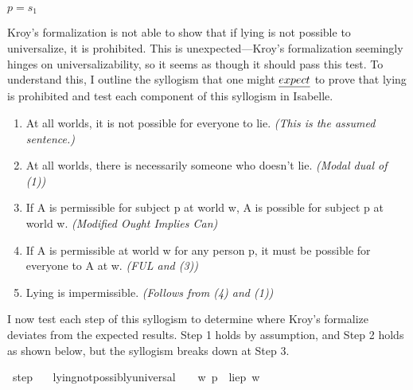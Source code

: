 \begin{isabellebody}
{    $p = s_1$ \color{black}%
}%
\endisatagproof
{\isafoldproof}%
%
\isadelimproof
%
\endisadelimproof
%
\begin{isamarkuptext}%
Kroy's formalization is not able to show that if lying is not possible 
      to universalize, it is prohibited. This is unexpected—Kroy's formalization seemingly hinges
on universalizability, so it seems as though it should pass this test. To understand this, I 
  outline the syllogism that one might $\emph{expect}$ to prove that lying is prohibited and 
test each component of this syllogism in Isabelle.%
\end{isamarkuptext}\isamarkuptrue%
%
\begin{isamarkuptext}%
\begin{enumerate}
        \item At all worlds, it is not possible for everyone to lie. \emph{(This is the assumed sentence.)}
        \item At all worlds, there is necessarily someone who doesn't lie. \emph{(Modal dual of (1))}
        \item If A is permissible for subject p at world w, A is possible for subject p at world w. \emph{(Modified Ought Implies Can)}
        \item If A is permissible at world w for any person p, it must be possible for everyone to A at w. \emph{(FUL and (3))}
        \item Lying is impermissible. \emph{(Follows from (4) and (1))} \end{enumerate}%
\end{isamarkuptext}\isamarkuptrue%
%
\begin{isamarkuptext}%
I now test each step of this syllogism to determine where Kroy's formalize deviates from the
expected results. Step 1 holds by assumption, and Step 2 holds as shown below, but the syllogism breaks down
at Step 3.%
\end{isamarkuptext}\isamarkuptrue%
\isamarkupfalse%
\ step{}{\isacharcolon}\isanewline
\ \ \ {\isachardoublequoteopen}lying{\isacharunderscore}not{\isacharunderscore}possibly{\isacharunderscore}universal\ {\isasymlongrightarrow}\ {\isasymTurnstile}{\isacharparenleft}\ {\isacharparenleft}{\isasymbox}\ {\isacharparenleft}{\isasymlambda}w{\isachardot}\ {\isasymexists}p{\isachardot}\ {\isacharparenleft}\isactrlbold {\isasymnot}\ {\isacharparenleft}lie{\isacharparenleft}p{\isacharparenright}{\isacharparenright}\ w{\isacharparenright}{\isacharparenright}{\isacharparenright}{\isacharparenright}\ {\isachardoublequoteclose}\isanewline

\end{isabellebody}
